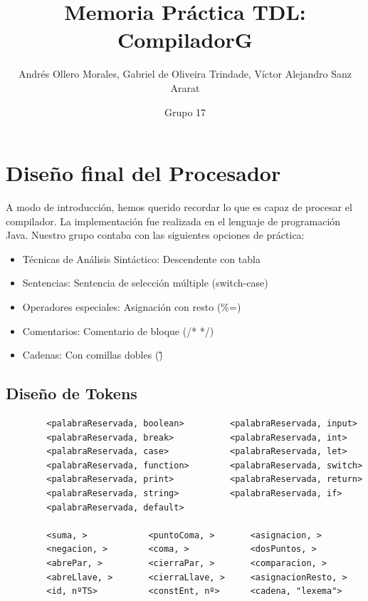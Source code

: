 \documentclass{article}[a4paper]
\title{Memoria Práctica TDL: CompiladorG}
\author{Andrés Ollero Morales, Gabriel de Oliveira Trindade, Víctor Alejandro Sanz Ararat}
\date{Grupo 17}
\begin{document}

\thispagestyle{empty}
\newpage
\tableofcontents
\thispagestyle{empty}
\newpage

\section{Diseño final del Procesador}
A modo de introducción, hemos querido recordar lo que es capaz de procesar el compilador. La implementación fue realizada en el lenguaje de programación Java. Nuestro grupo contaba con las siguientes opciones de práctica:
\begin{itemize}
    \item Técnicas de Análisis Sintáctico: Descendente con tabla
    \item Sentencias: Sentencia de selección múltiple (switch-case)
    \item Operadores especiales: Asignación con resto (\%=)
    \item Comentarios: Comentario de bloque (/* */)
    \item Cadenas: Con comillas dobles (\" \")
\end{itemize}

\subsection{Diseño de Tokens}
\begin{verbatim}
        <palabraReservada, boolean>         <palabraReservada, input>
        <palabraReservada, break>           <palabraReservada, int>
        <palabraReservada, case>            <palabraReservada, let>
        <palabraReservada, function>        <palabraReservada, switch>
        <palabraReservada, print>           <palabraReservada, return>
        <palabraReservada, string>          <palabraReservada, if>
        <palabraReservada, default>
        
        <suma, >            <puntoComa, >       <asignacion, >
        <negacion, >        <coma, >            <dosPuntos, >
        <abrePar, >         <cierraPar, >       <comparacion, >
        <abreLlave, >       <cierraLlave, >     <asignacionResto, >
        <id, nºTS>          <constEnt, nº>      <cadena, "lexema">
\end{verbatim}

\end{document}
